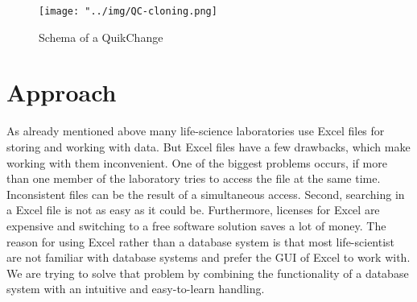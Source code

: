 \documentclass{bioinfo}
\begin{document}
\begin{figure}
	\texttt{[image: "../img/QC-cloning.png]}
	\caption{Schema of a QuikChange\textregistered  }
	\label{QC-pic}
\end{figure}

\section{Approach}
As already mentioned above many life-science laboratories use Excel files for storing and working with 
data. But Excel files have a few drawbacks, which make working with them inconvenient. One of the 
biggest problems occurs, if more than one member of the laboratory tries to access the file at the 
same time. Inconsistent files can be the result of a simultaneous access. Second, searching in a Excel file is not as easy as 
it could be. Furthermore, licenses for Excel are expensive and switching to a free software solution 
saves a lot of money. The reason for using Excel rather than a database system is that most life-scientist 
are not familiar with database systems and prefer the GUI of Excel to work with. We are 
trying to solve that problem by combining the functionality of a database system with an intuitive and 
easy-to-learn handling.
\end{document}
